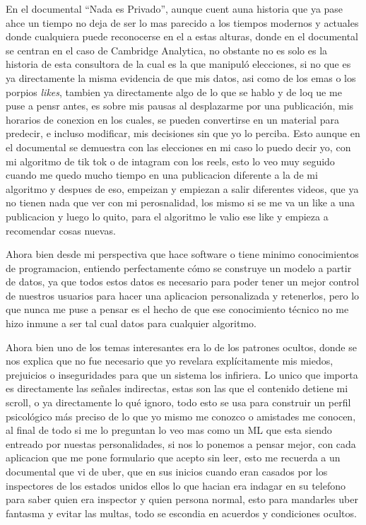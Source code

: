 \documentclass[letterpaper,11pt]{article}
\begin{document}


\newpage

\setcounter{page}{1}
\singlespacing



En el documental ``Nada es Privado'', aunque cuent auna historia que ya pase ahce un tiempo 
no deja de ser lo mas parecido a los tiempos modernos y actuales 
donde cualquiera puede reconocerse en el a estas alturas, 
donde en el documental se centran en el caso de Cambridge
Analytica, no obstante no es 
solo es la historia de esta consultora de la cual es la que manipuló elecciones,
si no que es ya directamente la misma evidencia de que mis datos, asi como de los emas 
o los porpios \textit{likes}, tambien ya directamente algo de lo que se hablo y de loq ue me puse a pensr antes, es sobre 
mis pausas al desplazarme por una publicación, 
mis horarios de conexion en los cuales, se pueden
convertirse en un material para predecir, 
e incluso modificar, mis decisiones sin que yo lo perciba. 
Esto aunque en el documental se demuestra con las elecciones 
en mi caso lo puedo decir yo, con mi algoritmo de tik tok o de intagram con los reels,
esto lo veo muy seguido cuando me quedo mucho tiempo en una publicacion diferente a la 
de mi algoritmo y despues de eso, empeizan y empiezan a salir diferentes videos, que ya no tienen nada que ver con mi perosnalidad, los mismo 
si se me va un like a una publicacion y luego lo quito, para el algoritmo le valio ese like y empieza a recomendar cosas nuevas.

Ahora bien desde mi perspectiva que hace software o tiene minimo conocimientos de programacion, 
entiendo perfectamente cómo se construye un modelo a partir de
datos, ya que todos estos datos es necesario para poder tener 
un mejor control de nuestros usuarios para hacer una aplicacion 
personalizada y retenerlos, pero 
lo que nunca me puse a pensar es el hecho de que 
ese conocimiento técnico no me hizo
inmune a ser tal cual datos para cualquier algoritmo.
 
Ahora bien uno de los temas interesantes era lo de los patrones ocultos, donde se nos explica 
que no fue necesario que yo revelara explícitamente mis miedos,
prejuicios o inseguridades para que un sistema los infiriera. 
Lo unico que importa es directamente las
señales indirectas, estas son las que
el contenido detiene mi scroll, o ya directamente lo
qué ignoro, todo esto se usa para construir 
un perfil psicológico más preciso de lo que yo mismo me conozco o amistades me conocen, al final de todo si me lo preguntan 
lo veo mas como un ML que esta siendo entreado por nuestas personalidades, 
si nos lo ponemos a pensar mejor, con cada aplicacion
que me pone formulario que acepto sin leer, esto me recuerda a 
un documental que vi de uber, que en sus inicios cuando eran casados por los inspectores de los estados unidos 
ellos lo que hacian era indagar en su telefono para saber 
quien era inspector y quien persona normal, esto para mandarles uber fantasma y evitar 
las multas, todo se escondia en acuerdos y condiciones ocultos.
\end{document}
